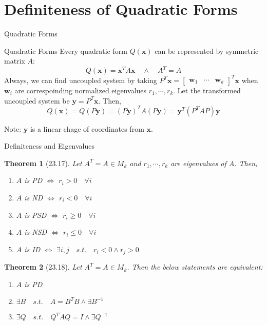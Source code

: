 \documentclass[a4paper,11pt]{article}
\newtheorem{thm}{Theorem}
\newcommand{\bd}{\mathbf}
\begin{document}
\section{Definiteness of Quadratic Forms} %
\label{sec:definiteness_of_quadratic_forms}
\begin{frame}[t]{Quadratic Forms}
	\begin{block}
		{Quadratic Forms} Every quadratic form $Q(\bd{x})$ can be represented by symmetric matrix $A$:\[
			Q(\bd{x}) = \bd{x}^T A \bd{x}\quad\land\quad A^T = A
		\]Always, we can find uncoupled system by taking $P^T \bd{x}=\begin{bmatrix}
			\bd{w}_1&\cdots&\bd{w}_k
		\end{bmatrix}^T\bd{x}$ when $\bd{w}_i$ are correspoinding normalized eigenvalues $r_1,\cdots,r_k$.
		Let the transformed uncoupled system be $\bd{y}=P^T\bd{x}$. Then, \[
			Q(\bd{x}) = Q(P\bd{y}) = (P\bd{y})^TA(P\bd{y})= \bd{y}^T (P^TAP)\bd{y}
		\]
	\end{block}
	Note: $\bd{y}$ is a linear chage of coordinates from $\bd{x}$.
\end{frame}

\begin{frame}[t]{Definiteness and Eigenvalues}
	\begin{thm}
		[23.17] Let $A^T=A\in M_k$ and $r_1,\cdots,r_k$ are eigenvalues of $A$. Then,
		\begin{enumerate}
			\item $A$ is PD $\iff$ $r_i>0\quad \forall i$
			\item $A$ is ND $\iff$ $r_i<0\quad \forall i$
			\item $A$ is PSD $\iff$ $r_i\ge 0\quad \forall i$
			\item $A$ is NSD $\iff$ $r_i\le 0\quad \forall i$
			\item $A$ is ID $\iff$ $\exists i,j \quad s.t. \quad  r_i<0 \land  r_j>0 $
		\end{enumerate}
	\end{thm}
	\begin{thm}
		[23.18]
		Let $A^T=A\in M_k$. Then the below statements are equivalent:
		\begin{enumerate}
			\item $A$ is PD
			\item $\exists B\quad s.t. \quad A=B^TB\land \exists B^{-1}$
			\item $\exists Q\quad s.t. \quad Q^TAQ=I\land\exists Q^{-1}$
		\end{enumerate}
	\end{thm}
\end{frame}
\end{document}
